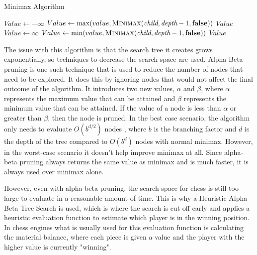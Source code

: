 \begin{algorithm}[h]
    \caption{Minimax Algorithm}
    \begin{algorithmic}
        \State \Return {}
        \EndIf
        \State $Value \gets -\infty$
        \State $Value \gets \max(value, \textsc{Minimax}(\textit{child}, \textit{depth} - 1, \textbf{false}))$
        \EndFor
        \State \Return $Value$
        \Else
        \State $Value \gets \infty$
        \State $Value \gets \min(value, \textsc{Minimax}(\textit{child}, \textit{depth} - 1, \textbf{false}))$
        \EndFor
        \State \Return $Value$
        \EndIf
        \EndFunction
    \end{algorithmic}
\end{algorithm}
The issue with this algorithm is that the search tree it creates grows exponentially, so techniques to decrease the search space are used. Alpha-Beta pruning is one such technique that is used to reduce the number of nodes that need to be explored. It does this by ignoring nodes that would not affect the final outcome of the algorithm. It introduces two new values, ${\alpha}$ and ${\beta}$, where ${\alpha}$ represents the maximum value that can be attained and ${\beta}$ represents the minimum value that can be attained. If the value of a node is less than ${\alpha}$ or greater than ${\beta}$, then the node is pruned. In the best case scenario, the algorithm only needs to evaluate ${O(b^{d/2})}$ nodes \cite{russellArtificialIntelligenceModern2022}, where ${b}$ is the branching factor and ${d}$ is the depth of the tree compared to ${O(b^d)}$ nodes with normal minimax. However, in the worst-case scenario it doesn't help improve minimax at all. Since alpha-beta pruning always returns the same value as minimax and is much faster, it is always used over minimax alone.

However, even with alpha-beta pruning, the search space for chess is still too large to evaluate in a reasonable amount of time.  This is why a Heuristic Alpha-Beta Tree Search is used, which is where the search is cut off early and applies a heuristic evaluation function to estimate which player is in the winning position. In chess engines what is usually used for this evaluation function is calculating the material balance, where each piece is given a value and the player with the higher value is currently "winning".

